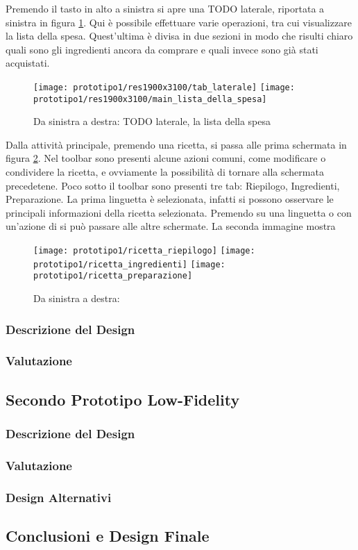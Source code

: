 Premendo il tasto in alto a sinistra si apre una TODO laterale, riportata a sinistra in figura \ref{fig:p1_lista_spesa}.
Qui è possibile effettuare varie operazioni, tra cui visualizzare la lista della spesa.
Quest'ultima è divisa in due sezioni in modo che risulti chiaro quali sono gli ingredienti ancora da comprare e quali invece sono già stati acquistati.

\begin{figure}[ht]
  \begin{center}
    \texttt{[image: prototipo1/res1900x3100/tab\_laterale]}
    \texttt{[image: prototipo1/res1900x3100/main\_lista\_della\_spesa]}
    \caption{Da sinistra a destra: TODO laterale, la lista della spesa}
    \label{fig:p1_lista_spesa}
  \end{center}
\end{figure}


Dalla attività principale, premendo una ricetta, si passa alle prima schermata in figura \ref{fig:p1_ricetta}.
Nel toolbar sono presenti alcune azioni comuni, come modificare o condividere la ricetta, e ovviamente la possibilità di tornare alla schermata precedetene.
Poco sotto il toolbar sono presenti tre tab: Riepilogo, Ingredienti, Preparazione.
La prima linguetta è selezionata, infatti si possono osservare le principali informazioni della ricetta selezionata.
Premendo su una linguetta o con un'azione di  si può passare alle altre schermate.
La seconda immagine mostra

\begin{figure}[ht]
  \begin{center}
    \texttt{[image: prototipo1/ricetta\_riepilogo]}
    \texttt{[image: prototipo1/ricetta\_ingredienti]}
    \texttt{[image: prototipo1/ricetta\_preparazione]}
    \caption{Da sinistra a destra: }
    \label{fig:p1_ricetta}
  \end{center}
\end{figure}



\clearpage
\subsubsection{Descrizione del Design}
\subsubsection{Valutazione}

\subsection{Secondo Prototipo Low-Fidelity}
\subsubsection{Descrizione del Design}
\subsubsection{Valutazione}

\subsubsection{Design Alternativi}

\subsection{Conclusioni e Design Finale}
